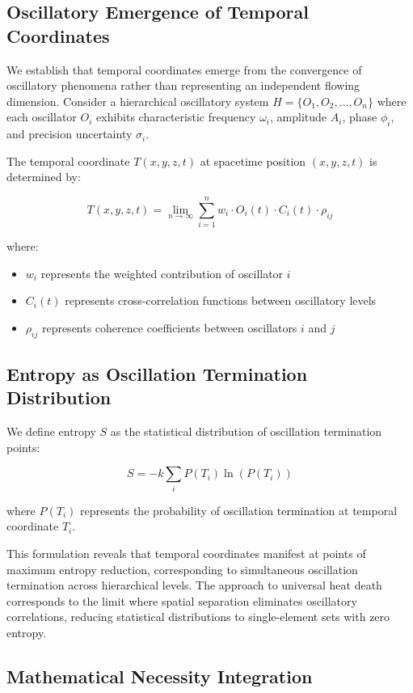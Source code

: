 \documentclass[11pt]{article}
\theoremstyle{remark}
\begin{document}
\subsection{Oscillatory Emergence of Temporal Coordinates}

We establish that temporal coordinates emerge from the convergence of oscillatory phenomena rather than representing an independent flowing dimension. Consider a hierarchical oscillatory system $H = \{O_1, O_2, \ldots, O_n\}$ where each oscillator $O_i$ exhibits characteristic frequency $\omega_i$, amplitude $A_i$, phase $\phi_i$, and precision uncertainty $\sigma_i$.

The temporal coordinate $T(x,y,z,t)$ at spacetime position $(x,y,z,t)$ is determined by:

$$T(x,y,z,t) = \lim_{n \to \infty} \sum_{i=1}^{n} w_i \cdot O_i(t) \cdot C_i(t) \cdot \rho_{ij}$$

where:
\begin{itemize}
\item $w_i$ represents the weighted contribution of oscillator $i$
\item $C_i(t)$ represents cross-correlation functions between oscillatory levels
\item $\rho_{ij}$ represents coherence coefficients between oscillators $i$ and $j$
\end{itemize}

\subsection{Entropy as Oscillation Termination Distribution}

We define entropy $S$ as the statistical distribution of oscillation termination points:

$$S = -k \sum_i P(T_i) \ln(P(T_i))$$

where $P(T_i)$ represents the probability of oscillation termination at temporal coordinate $T_i$.

This formulation reveals that temporal coordinates manifest at points of maximum entropy reduction, corresponding to simultaneous oscillation termination across hierarchical levels. The approach to universal heat death corresponds to the limit where spatial separation eliminates oscillatory correlations, reducing statistical distributions to single-element sets with zero entropy.

\subsection{Mathematical Necessity Integration}
\end{document}
